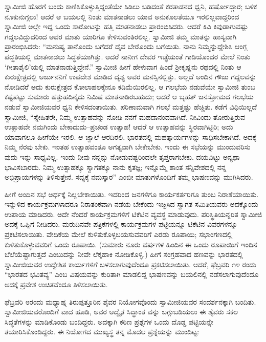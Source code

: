 ಸ್ವಾಮೀಜಿ ಹೊರಗೆ ಬಂದು ಕಾಣಿಸಿಕೊಳ್ಳುತ್ತಿದ್ದಂತೆಯೇ ಸಿಡಿಲು ಬಡಿದಂತೆ ಕರತಾಡನದ ಧ್ವನಿ, ಹರ್ಷೋದ್ಗಾರ; ಬಳಿಕ ನೂಕುನುಗ್ಗಲು! ಆದರೆ ಆ ಬಯಲಲ್ಲಿ ನಿಂತು ಮಾತನಾಡಲು ಯಾವ ಅನುಕೂಲತೆಯೂ ಇರಲಿಲ್ಲವಾದ್ದರಿಂದ ಸ್ವಾಮೀಜಿ ಅಲ್ಲೇ ಇದ್ದ ಒಂದು ಸಾರೋಟನ್ನು ಹತ್ತಿ ಮಾತನಾಡಲು ಪ್ರಾರಂಭಿಸಿದರು. ಆದರೆ ಕಿವಿ ಕಿವುಡಾಗುವಷ್ಟು ಗದ್ದಲವಿದ್ದುದರಿಂದ ಅವರ ಮಾತು ಯಾರಿಗೂ ಕೇಳಿಸುವಂತಿರಲಿಲ್ಲ. ಸ್ವಾಮೀಜಿ ತಮ್ಮ ಮಾತನ್ನು ಹಾಸ್ಯವಾಗಿ ಪ್ರಾರಂಭಿಸಿದರು: “ಮನುಷ್ಯ ತಾನೊಂದು ಬಗೆದರೆ ದೈವ ಬೇರೊಂದು ಬಗೆಯಿತು. ನಾನು ನಿಮ್ಮನ್ನುದ್ದೇಶಿಸಿ ಆಂಗ್ಲ ಪದ್ಧತಿಯಲ್ಲಿ ಮಾತನಾಡಲು ಸಿದ್ಧತೆಯಾಗಿತ್ತು. ಆದರೆ ನಾನೀಗ ದೇವರ ಇಚ್ಛೆಯಂತೆ ಗಾಡಿಯೊಂದರ ಮೇಲೆ ನಿಂತು ‘ಗೀತಾಶೈಲಿ’ಯಲ್ಲಿ ಮಾತನಾಡುತ್ತಿದ್ದೇನೆ.” ಸ್ವಾಮೀಜಿ ಹೀಗೆ ಹೇಳುವಾಗ ಹಿಂದೆ ಶ್ರೀಕೃಷ್ಣನು ರಥದಲ್ಲಿ ನಿಂತು ಆ ಕುರುಕ್ಷೇತ್ರದಲ್ಲಿ ಅರ್ಜುನನಿಗೆ ಉಪದೇಶ ಮಾಡಿದ ದೃಶ್ಯ ಅವರ ಮನಸ್ಸಿನಲ್ಲಿತ್ತು. ಅಲ್ಲದೆ ಅಂದಿನ ಗೌಜು ಗದ್ದಲವನ್ನು ನೋಡಿದರೆ ಅದು ಕುರುಕ್ಷೇತ್ರದ ಕೋಲಾಹಲಕ್ಕೇನೂ ಕಡಿಮೆಯಿರಲಿಲ್ಲ. ಆ ಗಲಭೆಯ ನಡುವೆಯೇ ಸ್ವಾಮೀಜಿ ತುಂಬ ಕಷ್ಟಪಟ್ಟು ಸುಮಾರು ಹತ್ತುಹದಿನೈದು ನಿಮಿಷ ಮಾತನಾಡಿರಬಹುದು; ಆದರೆ ಆ ಬೃಹತ್ ಜನಸ್ತೋಮದ ಗಲಭೆಯ ನಡುವೆ ಸ್ವಾಮೀಜಿಯವರ ಧ್ವನಿ ಕೇಳಿಸದಂತಾಯಿತು. ಪರಿಣಾಮವಾಗಿ ಗಲಭೆ ಮತ್ತಷ್ಟು ಹೆಚ್ಚಿತು. ಕಡೆಗೆ ವಿಧಿಯಿಲ್ಲದೆ ಸ್ವಾಮೀಜಿ, “ಸ್ನೇಹಿತರೇ, ನಿಮ್ಮ ಉತ್ಸಾಹವನ್ನು ನೋಡಿ ನನಗೆ ಮಹದಾನಂದವಾಗಿದೆ. ನೀವಿಂದು ತೋರುತ್ತಿರುವ ಉತ್ಸಾಹವೇ ನಮಗಿಂದು ಬೇಕಾದುದು–ಪ್ರಚಂಡ ಉತ್ಸಾಹ! ಆದರೆ ಆ ಉತ್ಸಾಹವನ್ನು ಸ್ಥಿರವಾಗಿಟ್ಟಿರಿ; ಅದು ಯಾವಾಗಲೂ ಹೀಗೆಯೇ ಇರಲಿ. ಆ ಜ್ವಾಲೆ ಆರದಿರಲಿ. ಭಾರತದಲ್ಲಿ ಮಹತ್ಕಾರ್ಯಗಳನ್ನು ಸಾಧಿಸಬೇಕಾಗಿದೆ. ಅದಕ್ಕೆ ನಿಮ್ಮ ನೆರವು ಬೇಕು. ಇಂತಹ ಉತ್ಸಾಹವಂತೂ ಅಗತ್ಯವಾಗಿ ಬೇಕೇಬೇಕು. ಇಂದು ಈ ಸಭೆಯನ್ನು ಮುಂದುವರಿಸು ವುದು ಇನ್ನು ಸಾಧ್ಯವಿಲ್ಲ. ಇಂದು ನೀವು ನನ್ನನ್ನು ನೋಡುವಷ್ಟರಿಂದಲೇ ತೃಪ್ತರಾಗಬೇಕು. ದಯವಿಟ್ಟು ಅನ್ಯಥಾ ಭಾವಿಸಬಾರದು. ನಿಮ್ಮ ಉತ್ಸಾಹಕ್ಕೂ ಸ್ವಾಗತಕ್ಕೂ ನಾನು ಕೃತಜ್ಞ; ಇನ್ನೊಮ್ಮೆ ಶಾಂತ ಸನ್ನಿವೇಶದಲ್ಲಿ ನನ್ನ ಅಭಿಪ್ರಾಯಗಳನ್ನು ತಿಳಿಸುತ್ತೇನೆ. ಸದ್ಯಕ್ಕೆ ನಮಸ್ಕಾರ” ಎಂಬೀ ಮಾತುಗಳೊಂದಿಗೆ ತಮ್ಮ ಭಾಷಣವನ್ನು ಮುಗಿಸಿದರು.

ಹೀಗೆ ಅಂದಿನ ಸಭೆ ಅರ್ಧಕ್ಕೆ ನಿಲ್ಲಬೇಕಾಯಿತು. ಇದರಿಂದ ಜನಗಳಿಗೂ ಕಾರ್ಯಕರ್ತರಿಗೂ ತುಂಬ ನಿರಾಶೆಯಾಯಿತು. ಇನ್ನುಳಿದ ಕಾರ್ಯಕ್ರಮಗಳಾದರೂ ನಿರಾತಂಕವಾಗಿ ನಡೆಯ ಬೇಕೆಂದು ಇಚ್ಛಿಸಿದ ಸ್ವಾಗತ ಸಮಿತಿಯವರು ಅದಕ್ಕೊಂದು ಉಪಾಯ ಮಾಡಿದರು. ಅದೇ ನೆಂದರೆ ಕಾರ್ಯಕ್ರಮಗಳಿಗೆ ಟಿಕೆಟಿನ ವ್ಯವಸ್ಥೆ ಮಾಡುವುದು. ಪರಿಸ್ಥಿತಿಯನ್ನರಿತ ಸ್ವಾಮೀಜಿ ಅದಕ್ಕೆ ಒಪ್ಪಿಗೆ ನೀಡಿದರು. ಮರುದಿನವೇ ಪತ್ರಿಕೆಗಳಲ್ಲಿ ಕಾರ್ಯಕ್ರಮಗಳ ಪಟ್ಟಿಯನ್ನೂ ಟಿಕೆಟಿನ ವಿವರಗಳನ್ನೂ ಪ್ರಕಟಿಸಲಾಯಿತು. ವೇದಿಕೆಯ ಮೇಲೆ ಕುಳಿತುಕೊಳ್ಳಬಯಸುವವರಿಗೆ ಎರಡು ರೂಪಾಯಿ; ಸಭಾಂಗಣದಲ್ಲಿ ಕುಳಿತುಕೊಳ್ಳುವವರಿಗೆ ಒಂದು ರೂಪಾಯಿ. (ಸುಮಾರು ನೂರು ವರ್ಷಗಳ ಹಿಂದಿನ ಈ ಒಂದು ರೂಪಾಯಿಗೆ ಇಂದಿನ ಬೆಲೆಯೆಷ್ಟಾಗುತ್ತದೆ ಎಂಬುದನ್ನು ನೀವೇ ಲೆಕ್ಕಹಾಕಿ ನೋಡಿಕೊಳ್ಳಿ.) ಹೀಗೆ ಸಂಗ್ರಹವಾದ ಹಣವನ್ನು ಭಾರತದಲ್ಲಿ ಸ್ವಾಮೀಜಿಯವರ ಉದ್ದೇಶಿತ ಕಾರ್ಯಗಳಿಗೆ ಬಳಸಲಾಗುವುದೆಂದೂ ಪ್ರಕಟಿಸಲಾಯಿತು. ಆದರೆ, ಫೆಬ್ರವರಿ ೧೪ ರಂದು “ಭಾರತದ ಭವಿತವ್ಯ” ಎಂಬ ವಿಷಯವನ್ನು ಕುರಿತಾಗಿ ಮಾಡಲಿದ್ದ ಭಾಷಣವನ್ನು ಬಯಲಿನಲ್ಲಿ ನಡೆಸಲಾಗುವುದೆಂದೂ ಅದಕ್ಕೆ ಪ್ರವೇಶ ಉಚಿತವೆಂದೂ ತಿಳಿಸಲಾಯಿತು.

ಫೆಬ್ರವರಿ ೮ರಂದು ಮಧ್ಯಾಹ್ನ ತಿರುಪ್ಪತ್ತೂರಿನ ಶೈವರ ನಿಯೋಗವೊಂದು ಸ್ವಾಮೀಜಿಯವರ ಸಂದರ್ಶನಕ್ಕಾಗಿ ಬಂದಿತು. ಸ್ವಾಮೀಜಿಯವರೊಂದಿಗೆ ವಾದ ಹೂಡಿ, ಅವರ ಅದ್ವೈತ ಸಿದ್ಧಾಂತ ವನ್ನು ಬಗ್ಗುಬಡಿಯಲು ಈ ಶೈವರು ಸಕಲ ಸಿದ್ಧತೆಗಳನ್ನು ಮಾಡಿಕೊಂಡು ಬಂದಿದ್ದರು. ಅದಕ್ಕಾಗಿ ಕಠಿಣ ಪ್ರಶ್ನೆಗಳ ಒಂದು ದೊಡ್ಡ ಪಟ್ಟಿಯನ್ನೇ ತಯಾರಿಸಿಕೊಂಡಿದ್ದರು. ಈ ನಿಯೋಗದ ಮುಖ್ಯಸ್ಥ ತನ್ನ ಮೊದಲ ಪ್ರಶ್ನೆಯನ್ನು ಮುಂದಿಟ್ಟ:

